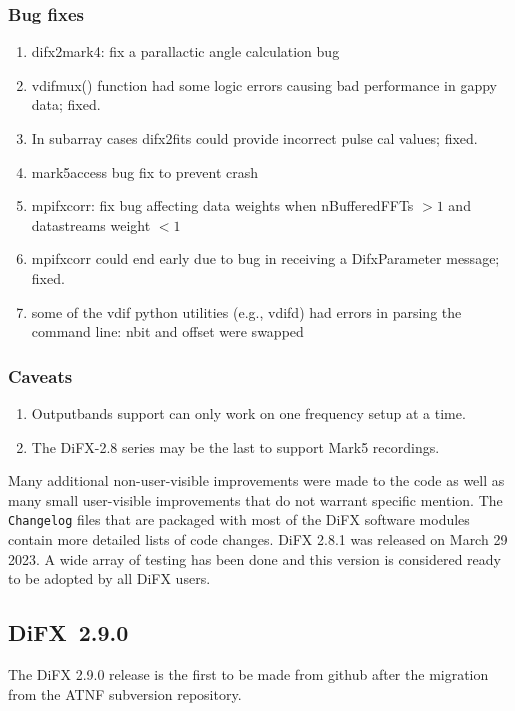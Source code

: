\subsubsection{Bug fixes}
\begin{enumerate}
\item difx2mark4: fix a parallactic angle calculation bug
\item vdifmux() function had some logic errors causing bad performance in gappy data; fixed.
\item In subarray cases difx2fits could provide incorrect pulse cal values; fixed.
\item mark5access bug fix to prevent crash
\item mpifxcorr: fix bug affecting data weights when nBufferedFFTs $> 1$ and datastreams weight $< 1$
\item mpifxcorr could end early due to bug in receiving a DifxParameter message; fixed.
\item some of the vdif python utilities (e.g., vdifd) had errors in parsing the command line: nbit and offset were swapped
\end{enumerate}

\subsubsection{Caveats}
\begin{enumerate}
\item Outputbands support can only work on one frequency setup at a time.
\item The DiFX-2.8 series may be the last to support Mark5 recordings. 
\end{enumerate}

Many additional non-user-visible improvements were made to the code as well as many small user-visible improvements that do not warrant specific mention.
The {\tt Changelog} files that are packaged with most of the DiFX software modules contain more detailed lists of code changes.
DiFX 2.8.1 was released on March 29 2023.
A wide array of testing has been done and this version is considered ready to be adopted by all DiFX users.

\subsection{DiFX~2.9.0}

The DiFX 2.9.0 release is the first to be made from github after the migration from the ATNF subversion repository.

